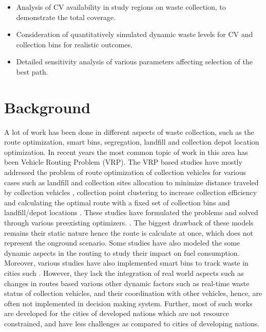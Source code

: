 \documentclass[12pt]{article}
\begin{document}
\begin{itemize}
\item Analysis of CV availability in study regions on waste collection, to demonstrate the total coverage.
\item Consideration of quantitatively simulated dynamic waste levels for CV and
collection bins for realistic outcomes.
\item Detailed sensitivity analysis of various parameters affecting selection of the best path.
\end{itemize}


\section{Background}

A lot of work has been done in different aspects of waste collection, such as the route optimization, smart bins, segregation, landfill and collection depot location optimization. In recent years the most common topic of work in this area has been Vehicle Routing Problem (VRP). The VRP based studies have mostly addressed the problem of route optimization of collection vehicles for various cases such as landfill and collection sites allocation to minimize distance traveled by collection vehicles \cite{kulcar1996optimizing,rathore2020location,barzehkar2019landfill}, collection point clustering to increase collection efficiency \cite{al2021optimization} and calculating the optimal route with a fixed set of collection bins and landfill/depot locations \cite{karadimas2008routing, amal2018sga, asefi2019mathematical,de2007decision, hannan2020waste,akhtar2017backtracking}. These studies have formulated the problems and solved through various preexisting optimizers.  \cite{karadimas2008routing,amal2018sga, malakahmad2014solid, hannan2020waste,de2007decision, grace2021smart}. The biggest drawback of these models remains their static nature hence the route is calculate at once, which does not represent the onground scenario. Some studies have also modeled the some dynamic aspects in the  routing to study their impact on fuel consumption\cite{hannan2020waste}. Moreover, various studies have also implemented smart bins to track waste in cities such  \cite{akhtar2017backtracking,lozano2018smart,baldo2021multi,anagnostopoulos2014effective, anagnostopoulos2015assessing, alwabli2020dynamic}. However, they lack the integration of real world aspects such as changes in routes based various other dynamic factors such as real-time waste status of collection vehicles, and their coordination with other vehicles, hence, are often not implemented in decision making system. Further, most of such works are developed for the cities of developed nations which are not resource constrained, and have less challenges as compared to cities of developing nations.\\
\end{document}
